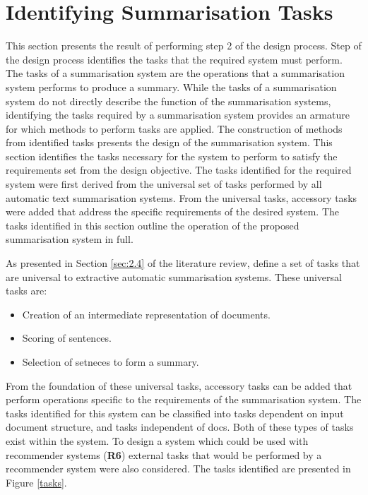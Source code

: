 \section{Identifying Summarisation Tasks}
This section presents the result of performing step 2 of the design process. Step of the design process identifies the tasks that the required system must perform. The tasks of a summarisation system are the operations that a summarisation system performs to produce a summary. While the tasks of a summarisation system do not directly describe the function of the summarisation systems, identifying the tasks required by a summarisation system provides an armature for which methods to perform tasks are applied.  The construction of methods from identified tasks presents the design of the summarisation system. This section identifies the tasks necessary for the system to perform to satisfy the requirements set from the design objective. The tasks identified for the required system were first derived from the universal set of tasks performed by all automatic text summarisation systems. From the universal tasks, accessory tasks were added that address the specific requirements of the desired system. The tasks identified in this section outline the operation of the proposed summarisation system in full.

As presented in Section \ref{sec:2.4} of the literature review, \citet{nenkova2012survey} define a set of tasks that are universal to extractive automatic summarisation systems. These universal tasks are:

\begin{itemize}
    \item Creation of an intermediate representation of documents.
    \item Scoring of sentences.
    \item Selection of setneces to form a summary.
\end{itemize}

From the foundation of these universal tasks, accessory tasks can be added that perform operations specific to the requirements of the summarisation system. The tasks identified for this system can be classified into tasks dependent on input document structure,  and tasks independent of docs. Both of these types of tasks exist within the system. To design a system which could be used with recommender systems (\textbf{R6}) external tasks that would be performed by a recommender system were also considered. The tasks identified are presented in Figure \ref{tasks}.

